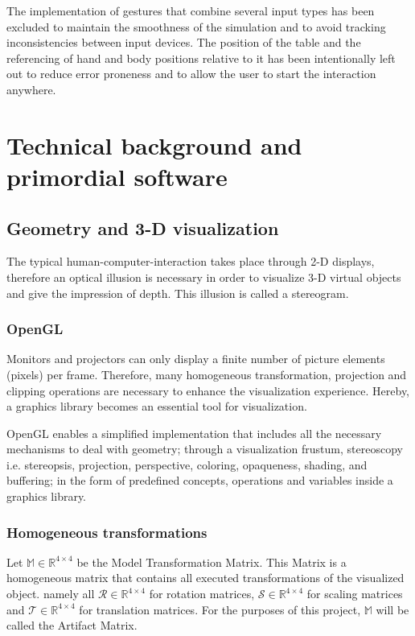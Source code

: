 \documentclass[12pt]{extarticle}
\newcommand{\R}{\mathbb{R}}
\newcommand{\Ro}{\mathcal{R}}
\newcommand{\Sc}{\mathcal{S}}
\newcommand{\Tr}{\mathcal{T}}
\newcommand{\Mod}{\mathbb{M}}
\begin{document}
The implementation of gestures that combine several input types has been excluded to maintain the smoothness of the simulation and to avoid tracking inconsistencies between input devices. The position of the table and the referencing of hand and body positions relative to it has been intentionally left out to reduce error proneness and to allow the user to start the interaction anywhere.

\section{Technical background and primordial software}\label{sec:AV}
\subsection {Geometry and 3-D visualization}\label{subsec: geo}
The typical human-computer-interaction takes place through 2-D displays, therefore an optical illusion is necessary in order to visualize 3-D virtual objects and give the impression of depth. This illusion is called a stereogram.

\subsubsection {OpenGL}\label{subsec{OGL}}
Monitors and projectors can only display a finite number of picture elements (pixels) per frame. Therefore, many homogeneous transformation, projection and clipping operations are necessary to enhance the visualization experience. Hereby, a graphics library becomes an essential tool for visualization.

OpenGL enables a simplified implementation that includes all the necessary mechanisms to deal with geometry; through a visualization frustum, stereoscopy i.e. stereopsis, projection, perspective, coloring, opaqueness, shading, and buffering; in the form of predefined concepts, operations and variables inside a graphics library.

\subsubsection {Homogeneous transformations}\label{subsubsec Hom}
Let $\Mod\in \R ^{4\times 4}$ be the Model Transformation Matrix. This Matrix is a homogeneous matrix that contains all executed transformations of the visualized object. namely all $\Ro \in \R ^{4\times 4}$ for rotation matrices, $\Sc \in \R ^{4\times 4}$ for scaling matrices and $\Tr \in \R ^{4\times 4}$ for translation matrices. For the purposes of this project, $\Mod$ will be called the Artifact Matrix.\cite{RST}
\end{document}
